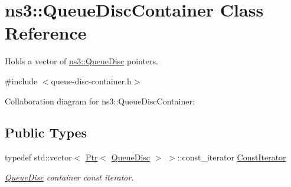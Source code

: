 \hypertarget{classns3_1_1QueueDiscContainer}{}\section{ns3\+:\+:Queue\+Disc\+Container Class Reference}
\label{classns3_1_1QueueDiscContainer}


Holds a vector of \hyperlink{classns3_1_1QueueDisc}{ns3\+::\+Queue\+Disc} pointers.  




{\ttfamily \#include $<$queue-\/disc-\/container.\+h$>$}



Collaboration diagram for ns3\+:\+:Queue\+Disc\+Container\+:
\subsection*{Public Types}
\begin{DoxyCompactItemize}
\item 
typedef std\+::vector$<$ \hyperlink{classns3_1_1Ptr}{Ptr}$<$ \hyperlink{classns3_1_1QueueDisc}{Queue\+Disc} $>$ $>$\+::const\+\_\+iterator \hyperlink{classns3_1_1QueueDiscContainer_a3c46b3a107b7b15d6b638ae50b5d9b58}{Const\+Iterator}
\begin{DoxyCompactList}\small\item\em \hyperlink{classns3_1_1QueueDisc}{Queue\+Disc} container const iterator. \end{DoxyCompactList}\end{DoxyCompactItemize}
